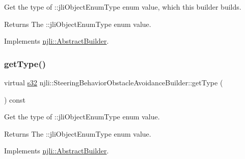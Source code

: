 Get the type of \+::jli\+Object\+Enum\+Type enum value, which this builder builds.

\begin{DoxyReturn}{Returns}
The \+::jli\+Object\+Enum\+Type enum value. 
\end{DoxyReturn}


Implements \mbox{\hyperlink{classnjli_1_1_abstract_builder_a0f2d344fcf697b167f4f2b1122b5fb33}{njli\+::\+Abstract\+Builder}}.

\mbox{\label{classnjli_1_1_steering_behavior_obstacle_avoidance_builder_a3ebfe2578e02d2d3384c4fe9a8da77dd}} 
\subsubsection{\texorpdfstring{get\+Type()}{getType()}}
{\footnotesize\ttfamily virtual \mbox{\hyperlink{_util_8h_aa62c75d314a0d1f37f79c4b73b2292e2}{s32}} njli\+::\+Steering\+Behavior\+Obstacle\+Avoidance\+Builder\+::get\+Type (\begin{DoxyParamCaption}{ }\end{DoxyParamCaption}) const\hspace{0.3cm}{\ttfamily [virtual]}}

Get the type of \+::jli\+Object\+Enum\+Type enum value.

\begin{DoxyReturn}{Returns}
The \+::jli\+Object\+Enum\+Type enum value. 
\end{DoxyReturn}


Implements \mbox{\hyperlink{classnjli_1_1_abstract_builder_abb4a8161cd71be12807fe85864b67050}{njli\+::\+Abstract\+Builder}}.

\mbox{\label{classnjli_1_1_steering_behavior_obstacle_avoidance_builder_a51471778f358264a1c49efcac6da28a6}} 
